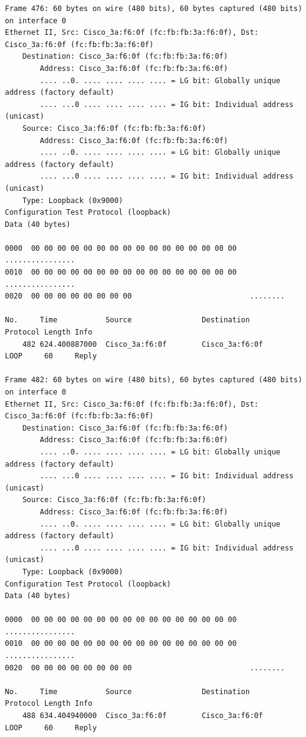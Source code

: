 \documentclass[a4paper,11pt]{article}
\begin{document}
\begin{lstlisting}
Frame 476: 60 bytes on wire (480 bits), 60 bytes captured (480 bits) on interface 0
Ethernet II, Src: Cisco_3a:f6:0f (fc:fb:fb:3a:f6:0f), Dst: Cisco_3a:f6:0f (fc:fb:fb:3a:f6:0f)
    Destination: Cisco_3a:f6:0f (fc:fb:fb:3a:f6:0f)
        Address: Cisco_3a:f6:0f (fc:fb:fb:3a:f6:0f)
        .... ..0. .... .... .... .... = LG bit: Globally unique address (factory default)
        .... ...0 .... .... .... .... = IG bit: Individual address (unicast)
    Source: Cisco_3a:f6:0f (fc:fb:fb:3a:f6:0f)
        Address: Cisco_3a:f6:0f (fc:fb:fb:3a:f6:0f)
        .... ..0. .... .... .... .... = LG bit: Globally unique address (factory default)
        .... ...0 .... .... .... .... = IG bit: Individual address (unicast)
    Type: Loopback (0x9000)
Configuration Test Protocol (loopback)
Data (40 bytes)

0000  00 00 00 00 00 00 00 00 00 00 00 00 00 00 00 00   ................
0010  00 00 00 00 00 00 00 00 00 00 00 00 00 00 00 00   ................
0020  00 00 00 00 00 00 00 00                           ........

No.     Time           Source                Destination           Protocol Length Info
    482 624.400887000  Cisco_3a:f6:0f        Cisco_3a:f6:0f        LOOP     60     Reply

Frame 482: 60 bytes on wire (480 bits), 60 bytes captured (480 bits) on interface 0
Ethernet II, Src: Cisco_3a:f6:0f (fc:fb:fb:3a:f6:0f), Dst: Cisco_3a:f6:0f (fc:fb:fb:3a:f6:0f)
    Destination: Cisco_3a:f6:0f (fc:fb:fb:3a:f6:0f)
        Address: Cisco_3a:f6:0f (fc:fb:fb:3a:f6:0f)
        .... ..0. .... .... .... .... = LG bit: Globally unique address (factory default)
        .... ...0 .... .... .... .... = IG bit: Individual address (unicast)
    Source: Cisco_3a:f6:0f (fc:fb:fb:3a:f6:0f)
        Address: Cisco_3a:f6:0f (fc:fb:fb:3a:f6:0f)
        .... ..0. .... .... .... .... = LG bit: Globally unique address (factory default)
        .... ...0 .... .... .... .... = IG bit: Individual address (unicast)
    Type: Loopback (0x9000)
Configuration Test Protocol (loopback)
Data (40 bytes)

0000  00 00 00 00 00 00 00 00 00 00 00 00 00 00 00 00   ................
0010  00 00 00 00 00 00 00 00 00 00 00 00 00 00 00 00   ................
0020  00 00 00 00 00 00 00 00                           ........

No.     Time           Source                Destination           Protocol Length Info
    488 634.404940000  Cisco_3a:f6:0f        Cisco_3a:f6:0f        LOOP     60     Reply


\end{lstlisting}
\end{document}
